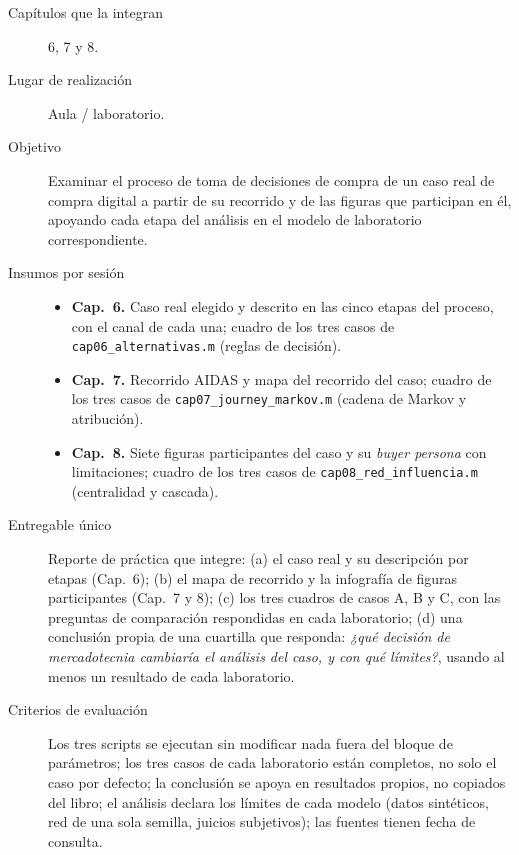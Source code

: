 \begin{description}
  \item[Capítulos que la integran] 6, 7 y 8.
  \item[Lugar de realización] Aula / laboratorio.
  \item[Objetivo] Examinar el proceso de toma de decisiones de compra de un
  caso real de compra digital a partir de su recorrido y de las figuras que
  participan en él, apoyando cada etapa del análisis en el modelo de
  laboratorio correspondiente.
  \item[Insumos por sesión] 
  \begin{itemize}
    \item \textbf{Cap.~6.} Caso real elegido y descrito en las cinco etapas del
    proceso, con el canal de cada una; cuadro de los tres casos de
    \texttt{cap06\_alternativas.m} (reglas de decisión).
    \item \textbf{Cap.~7.} Recorrido AIDAS y mapa del recorrido del caso;
    cuadro de los tres casos de \texttt{cap07\_journey\_markov.m} (cadena de
    Markov y atribución).
    \item \textbf{Cap.~8.} Siete figuras participantes del caso y su
    \textit{buyer persona} con limitaciones; cuadro de los tres casos de
    \texttt{cap08\_red\_influencia.m} (centralidad y cascada).
  \end{itemize}
  \item[Entregable único] Reporte de práctica que integre: (a) el caso real y
  su descripción por etapas (Cap.~6); (b) el mapa de recorrido y la infografía
  de figuras participantes (Cap.~7 y 8); (c) los tres cuadros de casos A, B
  y C, con las preguntas de comparación respondidas en cada laboratorio; (d)
  una conclusión propia de una cuartilla que responda: \emph{¿qué decisión de
  mercadotecnia cambiaría el análisis del caso, y con qué límites?}, usando al
  menos un resultado de cada laboratorio.
  \item[Criterios de evaluación] Los tres scripts se ejecutan sin modificar
  nada fuera del bloque de parámetros; los tres casos de cada laboratorio
  están completos, no solo el caso por defecto; la conclusión se apoya en
  resultados propios, no copiados del libro; el análisis declara los límites de
  cada modelo (datos sintéticos, red de una sola semilla, juicios subjetivos);
  las fuentes tienen fecha de consulta.
\end{description}
